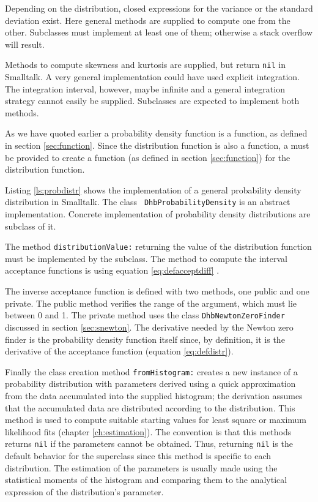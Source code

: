 Depending on the distribution, closed expressions for the variance
or the standard deviation exist. Here general methods are supplied
to compute one from the other. Subclasses must implement at least
one of them; otherwise a stack overflow will result.

Methods to compute skewness and kurtosis are supplied, but return
{\tt nil} in Smalltalk. A very general
implementation could have used explicit integration. The
integration interval, however, maybe infinite and a general
integration strategy cannot easily be supplied. Subclasses are
expected to implement both methods.

As we have quoted earlier a probability density function is a
function, as defined in section \ref{sec:function}. Since the
distribution function is also a function, a 
must be provided to create a function (as defined in section
\ref{sec:function}) for the distribution function.

Listing \ref{ls:probdistr} shows the implementation of a general
probability density distribution in Smalltalk. The class {\tt
DhbProbabilityDensity} is an abstract implementation. Concrete
implementation of probability density distributions are subclass
of it.

The method {\tt distributionValue:} returning the value of the
distribution function must be implemented by the subclass. The
method to compute the interval acceptance functions is using
equation \ref{eq:defacceptdiff} .

The inverse acceptance function is defined with two methods, one
public and one private. The public method verifies the range of
the argument, which must lie between 0 and 1. The private method
uses the class {\tt DhbNewtonZeroFinder} discussed in section
\ref{sec:snewton}. The derivative needed by the Newton zero finder
is the probability density function itself since, by definition,
it is the derivative of the acceptance function (\cf equation
\ref{eq:defdistr}).

Finally the class creation method {\tt fromHistogram:} creates a
new instance of a probability distribution with parameters derived
using a quick approximation from the data accumulated into the
supplied histogram; the derivation assumes that the accumulated
data are distributed according to the distribution. This method is
used to compute suitable starting values for least square or
maximum likelihood fits (\cf chapter \ref{ch:estimation}). The
convention is that this methods returns {\tt nil} if the
parameters cannot be obtained. Thus, returning {\tt nil} is the
default behavior for the superclass since this method is specific
to each distribution. The estimation of the parameters is usually
made using the statistical moments of the histogram and comparing
them to the analytical expression of the distribution's parameter.

